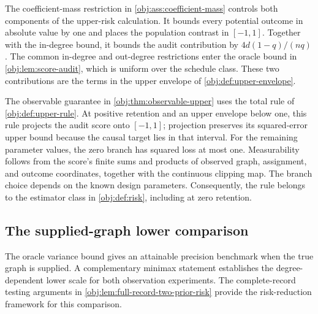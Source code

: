 The coefficient-mass restriction in \cref{obj:ass:coefficient-mass} controls both components of the upper-risk calculation. It bounds every potential outcome in absolute value by one and places the population contrast in \([-1,1]\). Together with the in-degree bound, it bounds the audit contribution by \(4d(1-q)/(nq)\). The common in-degree and out-degree restrictions enter the oracle bound in \cref{obj:lem:score-audit}, which is uniform over the schedule class. These two contributions are the terms in the upper envelope of \cref{obj:def:upper-envelope}.

The observable guarantee in \cref{obj:thm:observable-upper} uses the total rule of \cref{obj:def:upper-rule}. At positive retention and an upper envelope below one, this rule projects the audit score onto \([-1,1]\); projection preserves its squared-error upper bound because the causal target lies in that interval. For the remaining parameter values, the zero branch has squared loss at most one. Measurability follows from the score's finite sums and products of observed graph, assignment, and outcome coordinates, together with the continuous clipping map. The branch choice depends on the known design parameters. Consequently, the rule belongs to the estimator class in \cref{obj:def:risk}, including at zero retention.

\subsection{The supplied-graph lower comparison}

The oracle variance bound gives an attainable precision benchmark when the true graph is supplied. A complementary minimax statement establishes the degree-dependent lower scale for both observation experiments. The complete-record testing arguments in \cref{obj:lem:full-record-two-prior-risk} provide the risk-reduction framework for this comparison.

